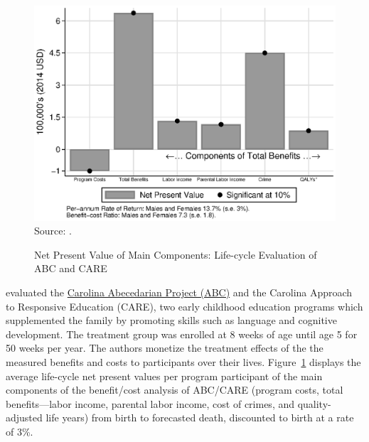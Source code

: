 \begin{figure}
\caption{Net Present Value of Main Components: Life-cycle Evaluation of ABC and CARE}\label{figure:main}
\centering
\includegraphics[width=.7\columnwidth]{output/abccare_npvssummredux.eps}
\footnotesize \justify
Source: \citet{Garcia-etal_2018_Quantifying_JPE}.
\end{figure}
	
\noindent \citet{Garcia-etal_2018_Quantifying_JPE} evaluated the \href{https://abc.fpg.unc.edu/abecedarian-project}{Carolina Abecedarian Project (ABC)} and the Carolina Approach to Responsive Education (CARE), two early childhood education programs which supplemented the family by promoting skills such as language and cognitive development. The treatment group was enrolled at 8 weeks of age until age 5 for 50 weeks  per year. The authors monetize the treatment effects of the the measured benefits and costs to participants over their lives. Figure~\ref{figure:main} displays the average life-cycle net present values per program participant of the main components of the benefit/cost analysis of ABC/CARE (program costs, total benefits---labor income, parental labor income, cost of crimes, and quality-adjusted life years) from birth to forecasted death, discounted to birth at a rate of 3\%.\\

